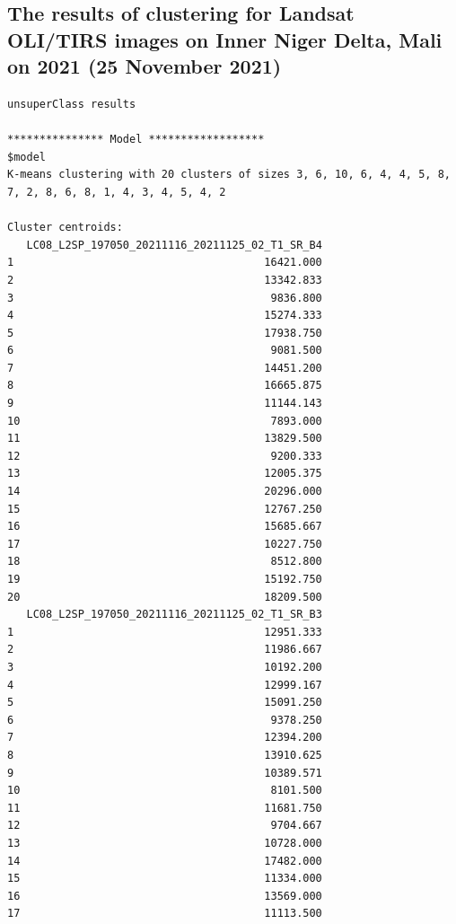 \documentclass[12pt,a4paper,oneside]{article}
\begin{document}
\subsection*{The results of clustering for Landsat OLI/TIRS images on Inner Niger Delta, Mali on 2021 (25 November 2021)}
\begin{scriptsize}
\begin{verbatim}
unsuperClass results

*************** Model ******************
$model
K-means clustering with 20 clusters of sizes 3, 6, 10, 6, 4, 4, 5, 8, 7, 2, 8, 6, 8, 1, 4, 3, 4, 5, 4, 2

Cluster centroids:
   LC08_L2SP_197050_20211116_20211125_02_T1_SR_B4
1                                       16421.000
2                                       13342.833
3                                        9836.800
4                                       15274.333
5                                       17938.750
6                                        9081.500
7                                       14451.200
8                                       16665.875
9                                       11144.143
10                                       7893.000
11                                      13829.500
12                                       9200.333
13                                      12005.375
14                                      20296.000
15                                      12767.250
16                                      15685.667
17                                      10227.750
18                                       8512.800
19                                      15192.750
20                                      18209.500
   LC08_L2SP_197050_20211116_20211125_02_T1_SR_B3
1                                       12951.333
2                                       11986.667
3                                       10192.200
4                                       12999.167
5                                       15091.250
6                                        9378.250
7                                       12394.200
8                                       13910.625
9                                       10389.571
10                                       8101.500
11                                      11681.750
12                                       9704.667
13                                      10728.000
14                                      17482.000
15                                      11334.000
16                                      13569.000
17                                      11113.500

\end{verbatim}
\end{scriptsize}
\end{document}
